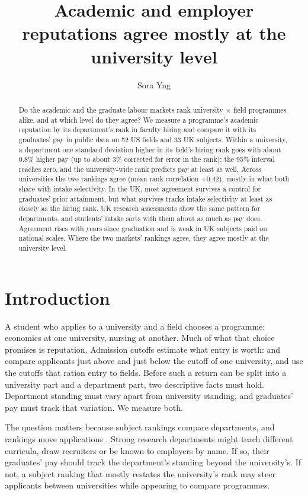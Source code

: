 \documentclass[11pt]{article}
\title{Academic and employer reputations agree mostly at the university level}
\author{Sora Yng}
\date{}
\begin{document}
\maketitle

\begin{abstract}
Do the academic and the graduate labour markets rank university $\times$ field programmes alike, and at which level
do they agree? We measure a programme's academic reputation by its department's rank in faculty hiring and compare
it with its graduates' pay in public data on 52 US fields and 33 UK subjects. Within a university, a department
one standard deviation higher in its field's hiring rank goes with about 0.8\% higher pay (up to about 3\% corrected
for error in the rank); the 95\% interval reaches zero, and the university-wide rank predicts pay at least as well.
Across universities the two rankings agree (mean rank correlation $+0.42$), mostly in what both share
with intake selectivity. In the UK, most agreement survives a control for graduates' prior attainment, but what
survives tracks intake selectivity at least as closely as the hiring rank. UK research assessments show the same
pattern for departments, and students' intake sorts with them about as much as pay does. Agreement rises with years since
graduation and is weak in UK subjects paid on national scales. Where the two markets' rankings agree, they agree
mostly at the university level.
\end{abstract}

\section{Introduction}\label{sec:intro}

A student who applies to a university and a field chooses a programme: economics at one university, nursing at
another. Much of what that choice promises is reputation. Admission cutoffs estimate what entry is worth:
\citet{hoekstra2009effect} and \citet{anelli2020returns} compare applicants just above and just below the cutoff of
one university, and \citet{kirkeboen2016field} use the cutoffs that ration entry to fields. Before such a return can
be split into a university part and a department part, two descriptive facts must hold. Department standing must vary
apart from university standing, and graduates' pay must track that variation. We measure both.

The question matters because subject rankings compare departments, and rankings move applications
\citep{bowman2009getting, luca2013salience}. Strong research departments might teach different curricula, draw
recruiters or be known to employers by name. If so, their graduates' pay should track the department's standing
beyond the university's. If not, a subject ranking that mostly restates the university's rank may steer applicants
between universities while appearing to compare programmes.
\end{document}
